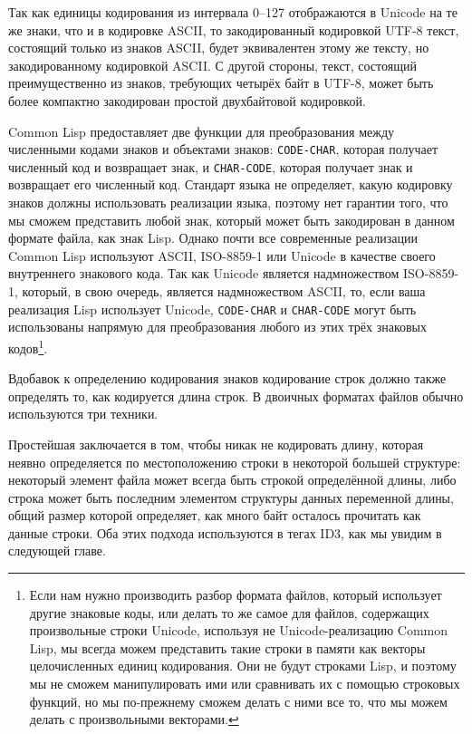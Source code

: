 Так как единицы кодирования из интервала 0--127 отображаются в Unicode на те же знаки, что
и в кодировке ASCII, то закодированный кодировкой UTF-8 текст, состоящий только из знаков
ASCII, будет эквивалентен этому же тексту, но закодированному кодировкой ASCII. С другой
стороны, текст, состоящий преимущественно из знаков, требующих четырёх байт в UTF-8, может
быть более компактно закодирован простой двухбайтовой кодировкой.

Common Lisp предоставляет две функции для преобразования между численными кодами знаков и
объектами знаков: \lstinline{CODE-CHAR}, которая получает численный код и возвращает знак, и
\lstinline{CHAR-CODE}, которая получает знак и возвращает его численный код. Стандарт языка
не определяет, какую кодировку знаков должны использовать реализации языка, поэтому нет
гарантии того, что мы сможем представить любой знак, который может быть закодирован в
данном формате файла, как знак Lisp. Однако почти все современные реализации Common Lisp
используют ASCII, ISO-8859-1 или Unicode в качестве своего внутреннего знакового кода. Так
как Unicode является надмножеством ISO-8859-1, который, в свою очередь, является
надмножеством ASCII, то, если ваша реализация Lisp использует Unicode, \lstinline{CODE-CHAR}
и \lstinline{CHAR-CODE} могут быть использованы напрямую для преобразования любого из этих
трёх знаковых кодов\footnote{Если нам нужно производить разбор формата файлов, который
  использует другие знаковые коды, или делать то же самое для файлов, содержащих
  произвольные строки Unicode, используя не Unicode-реализацию Common Lisp, мы всегда
  можем представить такие строки в памяти как векторы целочисленных единиц
  кодирования. Они не будут строками Lisp, и поэтому мы не сможем манипулировать ими или
  сравнивать их с помощью строковых функций, но мы по-прежнему сможем делать с ними все
  то, что мы можем делать с произвольными векторами.}.

Вдобавок к определению кодирования знаков кодирование строк должно также определять то,
как кодируется длина строк. В двоичных форматах файлов обычно используются три техники.

Простейшая заключается в том, чтобы никак не кодировать длину, которая неявно определяется
по местоположению строки в некоторой большей структуре: некоторый элемент файла может
всегда быть строкой определённой длины, либо строка может быть последним элементом
структуры данных переменной длины, общий размер которой определяет, как много байт осталось
прочитать как данные строки. Оба этих подхода используются в тегах ID3, как мы увидим в
следующей главе.

